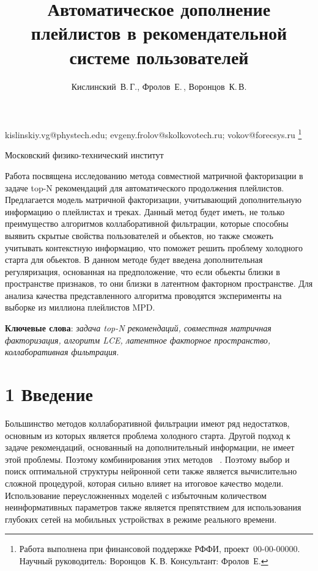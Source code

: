 \documentclass[12pt,twoside]{article}
\begin{document}
\title
    {Автоматическое дополнение плейлистов в рекомендательной системе пользователей}
\author
    {Кислинский~В.\,Г., Фролов~Е.\,, Воронцов~К.\,В.} %
\email
    {kislinskiy.vg@phystech.edu; evgeny.frolov@skolkovotech.ru; vokov@forecsys.ru}
\thanks
    {Работа выполнена при финансовой поддержке РФФИ, проект \No\,00-00-00000.
     Научный руководитель:  Воронцов~К.\,В.
     Консультант:  Фролов~Е.}

\organization
    {Московский физико-технический институт}
\abstract
	{Работа посвящена исследованию метода совместной матричной факторизации в задаче top-N рекомендаций для автоматического продолжения плейлистов. Предлагается  модель матричной факторизации, учитывающий дополнительную информацию о плейлистах и треках. Данный метод будет иметь, не только преимущество алгоритмов коллаборативной фильтрации, которые способны выявить скрытые свойства пользователей и обьектов,  но также сможеть учитывать контекстную информацию, что поможет решить проблему холодного старта для обьектов. В данном методе будет введена дополнительная регуляризация, основанная на предположение, что если обьекты близки в пространстве признаков, то они близки в латентном факторном пространстве. Для анализа качества представленного алгоритма проводятся эксперименты на выборке  из миллиона плейлистов MPD. 

\bigskip
\textbf{Ключевые слова}: \emph {задача top-N рекомендаций, совместная матричная факторизация, алгоритм LCE, латентное факторное пространство, коллаборативная фильтрация}.

}

\maketitle

\section{1 Введение}

Большинство методов коллаборативной фильтрации имеют ряд недостатков, основным из которых является проблема холодного старта. Другой подход к задаче рекомендаций, основанный на дополнительный информации, не имеет этой проблемы. Поэтому комбинирования этих методов ~\cite{sutskever2014}. Поэтому выбор и поиск оптимальной структуры  нейронной сети также является вычислительно сложной процедурой, которая сильно влияет на итоговое качество модели. Использование переусложненных моделей с избыточным количеством неинформативных параметров также является препятствием для использования глубоких сетей на мобильных устройствах в режиме реального времени.
\end{document}
